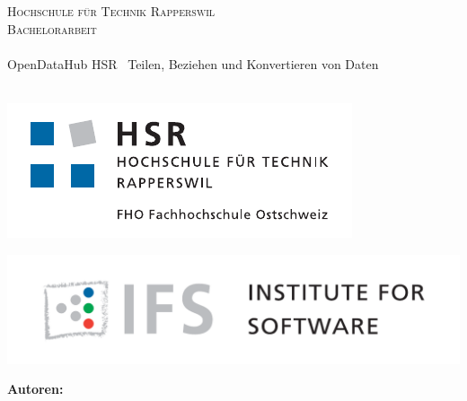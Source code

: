 
\author{
	\rlif \\
	\and
	\chuf \\
	\and
	\fscf \\
}

\clearpage
\begin{titlepage}
	
	\begin{center}
		\textsc{Hochschule für Technik Rapperswil} \\
		\textsc{Bachelorarbeit} \\ [25pt]
		\hr{0.5pt} \\[0.4cm]
		\huge OpenDataHub HSR \textendash\ Teilen, Beziehen und Konvertieren von Daten \\
		\hr{2pt} \\[0.5cm]
		
		\begin{figure}[H]
			\centering
		\end{figure}
		
		\begin{minipage}{0.49\textwidth}
			\includegraphics[width=\textwidth]{fig/hsr-logo}
		\end{minipage}
		\begin{minipage}{0.49\textwidth}
			\includegraphics[width=\textwidth]{fig/ifs-logo}
		\end{minipage}
		
		\vfill
	\end{center}
	
		
	\begin{flushleft}
		\textbf{\LARGE Autoren:}\\
		\Large \rlif \\
		\Large \chuf \\
		\Large \fscf \\
		\vspace{1cm}
		

\end{flushleft}
\end{titlepage}

